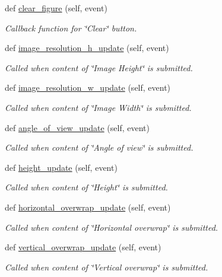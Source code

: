 \begin{DoxyCompactItemize}
def \hyperlink{classspecify__rect_1_1_polygon_builder_ae75d876010e03340950701b8f0470785}{clear\+\_\+figure} (self, event)
\begin{DoxyCompactList}\small\item\em Callback function for \char`\"{}\+Clear\char`\"{} button. \end{DoxyCompactList}\item 
def \hyperlink{classspecify__rect_1_1_polygon_builder_a712cdae443cb4478e34ffbb9aa1cbbbf}{image\+\_\+resolution\+\_\+h\+\_\+update} (self, event)
\begin{DoxyCompactList}\small\item\em Called when content of \char`\"{}\+Image Height\char`\"{} is submitted. \end{DoxyCompactList}\item 
def \hyperlink{classspecify__rect_1_1_polygon_builder_aa22d57e2c2f30a59eda71d107fc5f613}{image\+\_\+resolution\+\_\+w\+\_\+update} (self, event)
\begin{DoxyCompactList}\small\item\em Called when content of \char`\"{}\+Image Width\char`\"{} is submitted. \end{DoxyCompactList}\item 
def \hyperlink{classspecify__rect_1_1_polygon_builder_a3cd260cb4d5d11d5ae4c07140af2c8ff}{angle\+\_\+of\+\_\+view\+\_\+update} (self, event)
\begin{DoxyCompactList}\small\item\em Called when content of \char`\"{}\+Angle of view\char`\"{} is submitted. \end{DoxyCompactList}\item 
def \hyperlink{classspecify__rect_1_1_polygon_builder_a580cfa2cd0fe88cff4e3d9886256e19a}{height\+\_\+update} (self, event)
\begin{DoxyCompactList}\small\item\em Called when content of \char`\"{}\+Height\char`\"{} is submitted. \end{DoxyCompactList}\item 
def \hyperlink{classspecify__rect_1_1_polygon_builder_a22bef8c6f50d1195dc8713d2de529a8d}{horizontal\+\_\+overwrap\+\_\+update} (self, event)
\begin{DoxyCompactList}\small\item\em Called when content of \char`\"{}\+Horizontal overwrap\char`\"{} is submitted. \end{DoxyCompactList}\item 
def \hyperlink{classspecify__rect_1_1_polygon_builder_a50239e6d4954cc0d5b61404ee740a599}{vertical\+\_\+overwrap\+\_\+update} (self, event)
\begin{DoxyCompactList}\small\item\em Called when content of \char`\"{}\+Vertical overwrap\char`\"{} is submitted. \end{DoxyCompactList}\end{DoxyCompactItemize}
